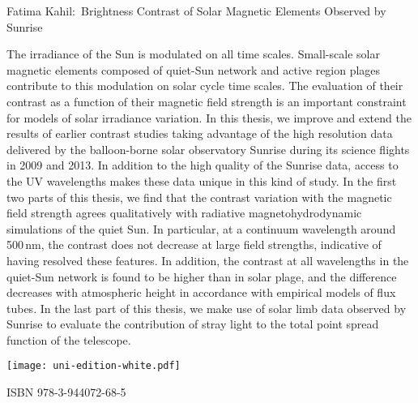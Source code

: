 \documentclass{article}
\begin{document}
\newpage

\null\vspace{-5cm}

\hspace*{-1.2cm}\colorbox{bcol}{\parbox[b][22cm][c]{15.2cm}{\null\hfill}}

\vspace{-19.4cm}


\hspace*{7mm}\begin{minipage}[t][17.5cm]{12cm}

\fontsize{12}{15}\selectfont

\textcolor{tcol}{Fatima Kahil:~Brightness Contrast of Solar Magnetic Elements Observed by Sunrise}%

\vspace{0.5cm}

\fontsize{12}{15}\selectfont

\textcolor{scol}{
The irradiance of the Sun is modulated on all time scales. Small-scale solar magnetic elements composed of quiet-Sun network and active region plages contribute to this modulation on solar cycle time scales. The evaluation of their contrast as a function of their magnetic field strength is an important constraint for models of solar irradiance variation. In this thesis, we improve and extend the results of earlier contrast studies taking advantage of the high resolution data delivered by the balloon-borne solar observatory Sunrise during its science flights in 2009 and 2013. In addition to the high quality of the Sunrise data, access to the UV wavelengths makes these data unique in this kind of study. In the first two parts of this thesis, we find that the contrast variation with the magnetic field strength agrees qualitatively with radiative magnetohydrodynamic simulations of the quiet Sun. In particular, at a continuum wavelength around 500\,nm, the contrast does not decrease at large field strengths, indicative of having resolved these features. In addition, the contrast  at all wavelengths in the quiet-Sun network is found to be higher than in solar plage, and the difference decreases with atmospheric height in accordance with empirical models of flux tubes. In the last part of this thesis, we make use of solar limb data observed by Sunrise to evaluate the contribution of stray light to the total point spread function of the telescope. }%

\vfill

\parbox[b]{30mm}{\texttt{[image: uni-edition-white.pdf]}}\hfill\textcolor{scol}{ISBN 978-3-944072-68-5}%

\end{minipage}
\end{document}
